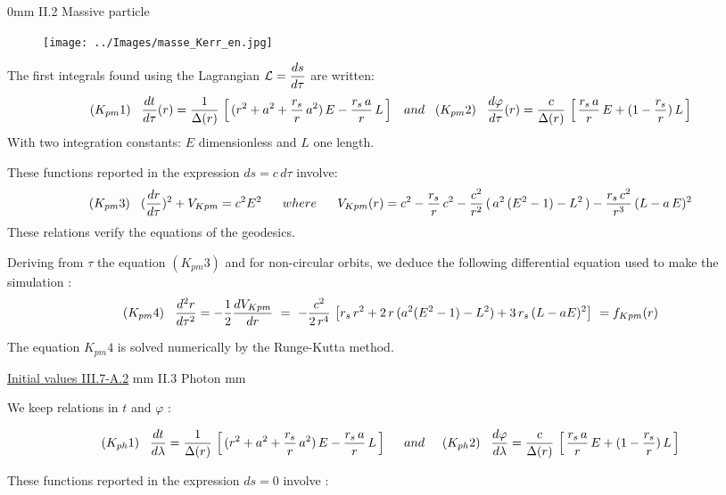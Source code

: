 \documentclass [12pt]{article}
\def\ph#1{\hskip #1}
\def\pv#1{\vskip #1}
\begin{document}
     \pv 50mm
      { II.2 Massive particle}
			
				\begin{figure}[!h]
	   \texttt{[image: ../Images/masse\_Kerr\_en.jpg]}	
	  \end{figure}  	
        \pv -2mm
               The first integrals found using the Lagrangian $\mathcal L=\displaystyle{ds\over d\tau}$ are written:
              \pv -4mm
        $$(K_{pm}1)\ph 3mm \displaystyle{dt\over d\tau}(r)={1\over\Delta(r)}\,\left[\,(r^2+a^2+{r_s\over r}\,a^2)\,E-{r_s\,a\over r}\,L\,\right]\ph 3mm  and\ph 3mm 
        (K_{pm}2)\ph 3mm \displaystyle{d\varphi\over d\tau}(r) = {c\over\Delta(r)}\,\left[\,{r_s\,a\over r}\,E+(1-{r_s\over r})\,L\,\right]$$
         With two integration constants: $E$ dimensionless and $L$ one length.
            
        These functions reported in the expression $ds=c\,d\tau$ involve:
       \pv -6mm
        $$(K_{pm}3)\ph 3mm \displaystyle({dr\over d\tau})^2+V_{Kpm}=c^2E^2 \ \ \ \ \ where \ \ \ \ \ V_{Kpm}(r)=c^2-{r_s\over r}\,c^2-{c^2\over r^2}\,(\,a^2\,(E^2-1)-L^2\,)-{r_s\,c^2\over r^3}\,(L-a\,E)^2 $$
               These relations verify the equations of the geodesics.

		  Deriving from $\tau$ the equation $(K_{pm}3)$ and for non-circular orbits, we deduce the following differential equation used to make the simulation : 
			\pv -4mm
		$$(K_{pm}4)\ph 3mm \frac{d^2r}{d\tau^2}=-\frac{1}{2}\frac{dV_{Kpm}}{dr}\  =\ -\frac{c^2}{2\,r^4}\,\left[r_s\,r^2+2\,r\,(a^2(E^2-1)-L^2)+3\,r_s\,(L-aE)^2\right]\ =f_{Kpm}(r)$$  
		\pv -4mm
	
		The equation $K_{pm}4$ is solved numerically by the Runge-Kutta method.
		 
		   \hyperlink{Kerrmassif} {Initial values III.7-A.2}
\pv 2mm
          { II.3 Photon}
  \pv 2mm     
   
           We keep relations in $t$ and $\varphi$  :  \pv -5mm
              
        $$(K_{ph}1)\ph 3mm \displaystyle{dt\over d\lambda}={1\over\Delta(r)}\,\left[\,(r^2+a^2+{r_s\over r}\,a^2)\,E-{r_s\,a\over r}\,L\,\right]\ph 5mm and \ph 5mm 
         (K_{ph}2)\ph 3mm \displaystyle{d\varphi\over d\lambda} = {c\over\Delta(r)}\,\left[\,{r_s\,a\over r}\,E+(1-{r_s\over r})\,L\,\right]$$
       
        These functions reported in the expression $ds=0$ involve :
             
\end{document}
